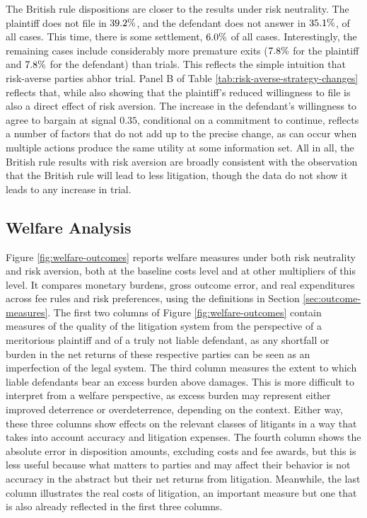 \documentclass{article}
\begin{document}
The British rule dispositions are closer to the results under risk neutrality. The plaintiff does not file in $39.2\%$, and the defendant does not answer in $35.1\%$, of all cases. This time, there is some settlement, $6.0\%$ of all cases. Interestingly, the remaining cases include considerably more premature exits ($7.8\%$ for the plaintiff and $7.8\%$ for the defendant) than trials. This reflects the simple intuition that risk-averse parties abhor trial. Panel B of Table \ref{tab:risk-averse-strategy-changes} reflects that, while also showing that the plaintiff's reduced willingness to file is also a direct effect of risk aversion. The increase in the defendant's willingness to agree to bargain at signal $0.35$, conditional on a commitment to continue, reflects a number of factors that do not add up to the precise change, as can occur when multiple actions produce the same utility at some information set. All in all, the British rule results with risk aversion are broadly consistent with the observation that the British rule will lead to less litigation, though the data do not show it leads to any increase in trial.

\subsection{Welfare Analysis}
\label{sec:welfare-analysis}

Figure \ref{fig:welfare-outcomes} reports welfare measures under both risk neutrality and risk aversion, both at the baseline costs level and at other multipliers of this level. It compares monetary burdens, gross outcome error, and real expenditures across fee rules and risk preferences, using the definitions in Section \ref{sec:outcome-measures}. The first two columns of Figure \ref{fig:welfare-outcomes} contain measures of the quality of the litigation system from the perspective of a meritorious plaintiff and of a truly not liable defendant, as any shortfall or burden in the net returns of these respective parties can be seen as an imperfection of the legal system. The third column measures the extent to which liable defendants bear an excess burden above damages. This is more difficult to interpret from a welfare perspective, as excess burden may represent either improved deterrence or overdeterrence, depending on the context. Either way, these three columns show effects on the relevant classes of litigants in a way that takes into account accuracy and litigation expenses. The fourth column shows the absolute error in disposition amounts, excluding costs and fee awards, but this is less useful because what matters to parties and may affect their behavior is not accuracy in the abstract but their net returns from litigation. Meanwhile, the last column illustrates the real costs of litigation, an important measure but one that is also already reflected in the first three columns.
\end{document}
